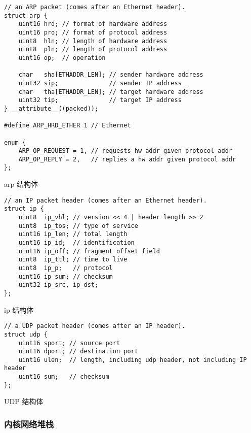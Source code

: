 \begin{listing}[!htb]
	\begin{verbatim}
// an ARP packet (comes after an Ethernet header).
struct arp {
    uint16 hrd; // format of hardware address
    uint16 pro; // format of protocol address
    uint8  hln; // length of hardware address
    uint8  pln; // length of protocol address
    uint16 op;  // operation
    
    char   sha[ETHADDR_LEN]; // sender hardware address
    uint32 sip;              // sender IP address
    char   tha[ETHADDR_LEN]; // target hardware address
    uint32 tip;              // target IP address
} __attribute__((packed));

#define ARP_HRD_ETHER 1 // Ethernet

enum {
    ARP_OP_REQUEST = 1, // requests hw addr given protocol addr
    ARP_OP_REPLY = 2,   // replies a hw addr given protocol addr
};
	\end{verbatim}
	\caption{arp 结构体}\label{lst:arp}
\end{listing}

\begin{listing}[!htb]
	\begin{verbatim}
// an IP packet header (comes after an Ethernet header).
struct ip {
    uint8  ip_vhl; // version << 4 | header length >> 2
    uint8  ip_tos; // type of service
    uint16 ip_len; // total length
    uint16 ip_id;  // identification
    uint16 ip_off; // fragment offset field
    uint8  ip_ttl; // time to live
    uint8  ip_p;   // protocol
    uint16 ip_sum; // checksum
    uint32 ip_src, ip_dst;
};
	\end{verbatim}
	\caption{ip 结构体}\label{lst:ip}
\end{listing}

\begin{listing}[!htb]
	\begin{verbatim}
// a UDP packet header (comes after an IP header).
struct udp {
    uint16 sport; // source port
    uint16 dport; // destination port
    uint16 ulen;  // length, including udp header, not including IP header
    uint16 sum;   // checksum
};
	\end{verbatim}
	\caption{UDP 结构体}\label{lst:UDP}
\end{listing}

\subsubsection{内核网络堆栈}

